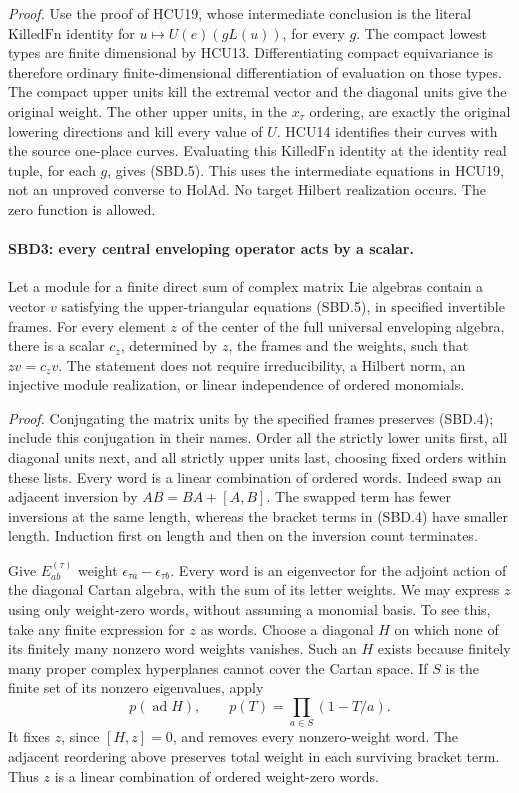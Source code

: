 \emph{Proof.}
Use the proof of HCU19, whose intermediate conclusion is the
literal \(\mathrm{KilledFn}\) identity for
\(u\mapsto U(e)(gL(u))\), for every \(g\).  The compact lowest
types are finite dimensional by HCU13.  Differentiating compact
equivariance is therefore ordinary finite-dimensional differentiation
of evaluation on those types.  The compact upper units kill the
extremal vector and the diagonal units give the original weight.
The other upper units, in the \(x_\tau\) ordering, are exactly the
original lowering directions and kill every value of \(U\).
HCU14 identifies their curves with the source one-place curves.
Evaluating this \(\mathrm{KilledFn}\) identity at the identity real
tuple, for each \(g\), gives (SBD.5).  This uses the intermediate
equations in HCU19, not an unproved converse to \(\mathrm{HolAd}\).
No target Hilbert realization occurs.  The zero function is allowed.

\paragraph{SBD3: every central enveloping operator acts by a scalar.}
\label{claim:SBD3}
Let a module for a finite direct sum of complex matrix Lie algebras
contain a vector \(v\) satisfying the upper-triangular equations
(SBD.5), in specified invertible frames.  For every element \(z\)
of the center of the full universal enveloping algebra, there is a
scalar \(c_z\), determined by \(z\), the frames and the weights,
such that \(zv=c_zv\).  The statement does not require
irreducibility, a Hilbert norm, an injective module realization, or
linear independence of ordered monomials.

\emph{Proof.}
Conjugating the matrix units by the specified frames preserves
(SBD.4); include this conjugation in their names.  Order all the
strictly lower units first, all diagonal units next, and all
strictly upper units last, choosing fixed orders within these lists.
Every word is a linear combination of ordered words.  Indeed swap
an adjacent inversion by \(AB=BA+[A,B]\).  The swapped term has
fewer inversions at the same length, whereas the bracket terms in
(SBD.4) have smaller length.  Induction first on length and then on
the inversion count terminates.

Give \(E^{(\tau)}_{ab}\) weight
\(\epsilon_{\tau a}-\epsilon_{\tau b}\).  Every word is an
eigenvector for the adjoint action of the diagonal Cartan algebra,
with the sum of its letter weights.  We may express \(z\) using
only weight-zero words, without assuming a monomial basis.  To see
this, take any finite expression for \(z\) as words.  Choose a
diagonal \(H\) on which none of its finitely many nonzero word
weights vanishes.  Such an \(H\) exists because finitely many proper
complex hyperplanes cannot cover the Cartan space.  If \(S\) is
the finite set of its nonzero eigenvalues, apply
\[
 p(\operatorname{ad}H),\qquad
 p(T)=\prod_{a\in S}(1-T/a).
 \tag{SBD.6}
\]
It fixes \(z\), since \([H,z]=0\), and removes every nonzero-weight
word.  The adjacent reordering above preserves total weight in
each surviving bracket term.  Thus \(z\) is a linear combination
of ordered weight-zero words.

